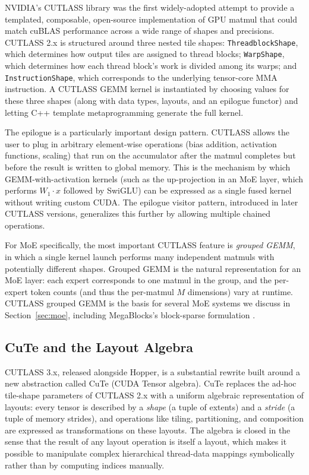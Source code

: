 \documentclass[10pt]{article}
\begin{document}
NVIDIA's CUTLASS library \citep{thakkar2023cutlass} was the first widely-adopted attempt to provide a templated, composable, open-source implementation of GPU matmul that could match cuBLAS performance across a wide range of shapes and precisions. CUTLASS 2.x is structured around three nested tile shapes: \texttt{ThreadblockShape}, which determines how output tiles are assigned to thread blocks; \texttt{WarpShape}, which determines how each thread block's work is divided among its warps; and \texttt{InstructionShape}, which corresponds to the underlying tensor-core MMA instruction. A CUTLASS GEMM kernel is instantiated by choosing values for these three shapes (along with data types, layouts, and an epilogue functor) and letting C++ template metaprogramming generate the full kernel.

The epilogue is a particularly important design pattern. CUTLASS allows the user to plug in arbitrary element-wise operations (bias addition, activation functions, scaling) that run on the accumulator after the matmul completes but before the result is written to global memory. This is the mechanism by which GEMM-with-activation kernels (such as the up-projection in an MoE layer, which performs $W_1 \cdot x$ followed by SwiGLU) can be expressed as a single fused kernel without writing custom CUDA. The epilogue visitor pattern, introduced in later CUTLASS versions, generalizes this further by allowing multiple chained operations.

For MoE specifically, the most important CUTLASS feature is \emph{grouped GEMM}, in which a single kernel launch performs many independent matmuls with potentially different shapes. Grouped GEMM is the natural representation for an MoE layer: each expert corresponds to one matmul in the group, and the per-expert token counts (and thus the per-matmul $M$ dimensions) vary at runtime. CUTLASS grouped GEMM is the basis for several MoE systems we discuss in Section~\ref{sec:moe}, including MegaBlocks's block-sparse formulation \citep{gale2023megablocks}.

\subsection{CuTe and the Layout Algebra}
\label{sec:matmul-cute}

CUTLASS 3.x, released alongside Hopper, is a substantial rewrite built around a new abstraction called CuTe (CUDA Tensor algebra). CuTe replaces the ad-hoc tile-shape parameters of CUTLASS 2.x with a uniform algebraic representation of layouts: every tensor is described by a \emph{shape} (a tuple of extents) and a \emph{stride} (a tuple of memory strides), and operations like tiling, partitioning, and composition are expressed as transformations on these layouts. The algebra is closed in the sense that the result of any layout operation is itself a layout, which makes it possible to manipulate complex hierarchical thread-data mappings symbolically rather than by computing indices manually.
\end{document}
